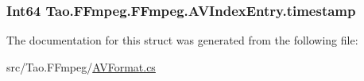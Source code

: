 \label{struct_tao_1_1_f_fmpeg_1_1_f_fmpeg_1_1_a_v_index_entry_a997f99cd105f41482411e62287cfad07}
\hypertarget{struct_tao_1_1_f_fmpeg_1_1_f_fmpeg_1_1_a_v_index_entry_aa6598a924561433c02e3111761fc7591}{
\subsubsection[{timestamp}]{\setlength{\rightskip}{0pt plus 5cm}Int64 {\bf Tao.FFmpeg.FFmpeg.AVIndexEntry.timestamp}}}
\label{struct_tao_1_1_f_fmpeg_1_1_f_fmpeg_1_1_a_v_index_entry_aa6598a924561433c02e3111761fc7591}


The documentation for this struct was generated from the following file:\begin{DoxyCompactItemize}
\item 
src/Tao.FFmpeg/\hyperlink{_a_v_format_8cs}{AVFormat.cs}\end{DoxyCompactItemize}

